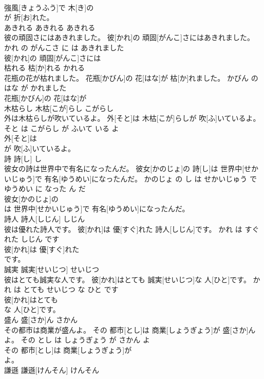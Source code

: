 \documentclass[8pt]{extreport}
\begin{document}
\begin{CJK}{UTF8}{min}
\\	強風[きょうふう]で 木[き]の
\\	が 折[お]れた。			
\\	あきれる	あきれる	あきれる	
\\	彼の頑固さにはあきれました。	彼[かれ]の 頑固[がんこ]さにはあきれました。	かれ の がんこさ に は あきれました	
\\	彼[かれ]の 頑固[がんこ]さには
\\	枯れる	枯[か]れる	かれる	
\\	花瓶の花が枯れました。	花瓶[かびん]の 花[はな]が 枯[か]れました。	かびん の はな が かれました	
\\	花瓶[かびん]の 花[はな]が
\\	木枯らし	木枯[こが]らし	こがらし	
\\	外は木枯らしが吹いているよ。	外[そと]は 木枯[こが]らしが 吹[ふ]いているよ。	そと は こがらし が ふいて いる よ	
\\	外[そと]は
\\	が 吹[ふ]いているよ。			
\\	詩	詩[し]	し	
\\	彼女の詩は世界中で有名になったんだ。	彼女[かのじょ]の 詩[し]は 世界中[せかいじゅう]で 有名[ゆうめい]になったんだ。	かのじょ の し は せかいじゅう で ゆうめい に なった ん だ	
\\	彼女[かのじょ]の
\\	は 世界中[せかいじゅう]で 有名[ゆうめい]になったんだ。			
\\	詩人	詩人[しじん]	しじん	
\\	彼は優れた詩人です。	彼[かれ]は 優[すぐ]れた 詩人[しじん]です。	かれ は すぐれた しじん です	
\\	彼[かれ]は 優[すぐ]れた
\\	です。			
\\	誠実	誠実[せいじつ]	せいじつ	
\\	彼はとても誠実な人です。	彼[かれ]はとても 誠実[せいじつ]な 人[ひと]です。	かれ は とても せいじつ な ひと です	
\\	彼[かれ]はとても
\\	な 人[ひと]です。			
\\	盛ん	盛[さか]ん	さかん	
\\	その都市は商業が盛んよ。	その 都市[とし]は 商業[しょうぎょう]が 盛[さか]んよ。	その とし は しょうぎょう が さかん よ	
\\	その 都市[とし]は 商業[しょうぎょう]が
\\	よ。			
\\	謙遜	謙遜[けんそん]	けんそん	

\end{CJK}
\end{document}
